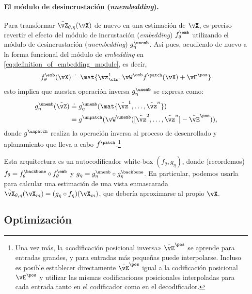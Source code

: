 \documentclass[../../book-main_es.tex]{subfiles}
\begin{document}
\paragraph{El módulo de desincrustación (\textit{unembedding}).} Para transformar
\(\tilde{\vZ}_{\theta, \eta}(\vX)\) de nuevo en una estimación de
\(\vX\), es preciso revertir el efecto del módulo de incrustación (\textit{embedding})
\(f_{\theta}^{\emb}\) utilizando el módulo de desincrustación (\textit{unembedding})
\(g_{\eta}^{\unemb}\). Así pues, acudiendo de nuevo a la forma funcional
del módulo de \textit{embedding} en \eqref{eq:definition_of_embedding_module}, es decir,
\begin{equation}
f_{\theta}^{\emb}(\vX) \doteq \mat{\vz_{\cls}^{1},
\vW^{\emb}f^{\patch}(\vX) + \vE^{\pos}}
\end{equation}
esto implica que nuestra operación inversa \(g_{\eta}^{\unemb}\) se expresa
como:
\begin{align}
g_{\eta}^{\unemb}(\tilde{\vZ}) &\doteq
g_{\eta}^{\unemb}(\mat{\tilde{\vz}^{1}, \dots, \tilde{\vz}^{n}}) \\
&=
g^{\unpatch}(\vW^{\unemb}([\tilde{\vz}^{2}, \dots, \tilde{\vz}^{n}] -
\tilde{\vE}^{\pos})),
\end{align}
donde \(g^{\unpatch}\) realiza la operación inversa al proceso de
desenrollado y aplanamiento que lleva a cabo \(f^{\patch}\).\footnote{Una vez más,
la «codificación posicional inversa» \(\tilde{\vE}^{\pos}\) se aprende
para entradas grandes, y para entradas más pequeñas puede interpolarse. Incluso
es posible establecer directamente \(\tilde{\vE}^{\pos}\) igual a la
codificación posicional \(\vE^{\pos}\) y utilizar las mismas codificaciones posicionales interpoladas
para cada entrada tanto en el codificador como en el decodificador.}

Esta arquitectura es un autocodificador white-box \((f_{\theta}, g_{\eta})\), donde (recordemos) 
\(f_{\theta} = f_{\theta}^{\backbone} \circ f_{\theta}^{\emb}\) y \(g_{\eta} = g_{\eta}^{\unemb} \circ g_{\eta}^{\backbone}\). 
En particular, podemos usarla para calcular una estimación de una vista enmascarada 
\(\hat{\vX}_{\theta, \eta}(\vX_{m}) = (g_{\eta} \circ f_{\eta})(\vX_{m})\), 
que debería aproximarse al propio \(\vX\).

\subsection{Optimización}\label{sub:image_completion_optimization}
\end{document}
